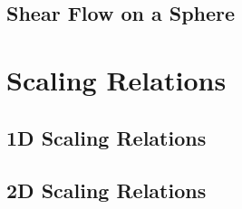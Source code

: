 \subsection*{Shear Flow on a Sphere}




\section{Scaling Relations}

\subsection*{1D Scaling Relations}

\subsection*{2D Scaling Relations}











% 
% 
